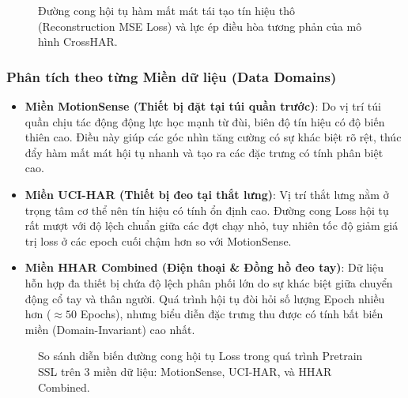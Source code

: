 \begin{enumerate}
    \begin{figure}[h!]
    \centering
    \caption{Đường cong hội tụ hàm mất mát tái tạo tín hiệu thô (Reconstruction MSE Loss) và lực ép điều hòa tương phản của mô hình CrossHAR.}
    \label{fig:pretrain_crosshar_loss}
    \end{figure}
\end{enumerate}

\subsubsection{Phân tích theo từng Miền dữ liệu (Data Domains)}

\begin{itemize}
    \item \textbf{Miền MotionSense (Thiết bị đặt tại túi quần trước)}: 
    Do vị trí túi quần chịu tác động động lực học mạnh từ đùi, biên độ tín hiệu có độ biến thiên cao. Điều này giúp các góc nhìn tăng cường có sự khác biệt rõ rệt, thúc đẩy hàm mất mát hội tụ nhanh và tạo ra các đặc trưng có tính phân biệt cao.
    
    \item \textbf{Miền UCI-HAR (Thiết bị đeo tại thắt lưng)}: 
    Vị trí thắt lưng nằm ở trọng tâm cơ thể nên tín hiệu có tính ổn định cao. Đường cong Loss hội tụ rất mượt với độ lệch chuẩn giữa các đợt chạy nhỏ, tuy nhiên tốc độ giảm giá trị loss ở các epoch cuối chậm hơn so với MotionSense.
    
    \item \textbf{Miền HHAR Combined (Điện thoại \& Đồng hồ đeo tay)}: 
    Dữ liệu hỗn hợp đa thiết bị chứa độ lệch phân phối lớn do sự khác biệt giữa chuyển động cổ tay và thân người. Quá trình hội tụ đòi hỏi số lượng Epoch nhiều hơn ($\approx 50$ Epochs), nhưng biểu diễn đặc trưng thu được có tính bất biến miền (Domain-Invariant) cao nhất.
\end{itemize}

\begin{figure}[h!]
\centering
\caption{So sánh diễn biến đường cong hội tụ Loss trong quá trình Pretrain SSL trên 3 miền dữ liệu: MotionSense, UCI-HAR, và HHAR Combined.}
\label{fig:pretrain_domain_comparison}
\end{figure}

